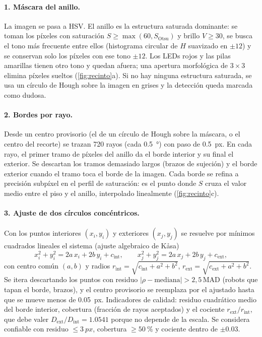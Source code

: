 \paragraph{1. Máscara del anillo.} La imagen se pasa a HSV. El anillo es la estructura saturada
dominante: se toman los píxeles con saturación $S \geq \max(60, S_{\mathrm{Otsu}})$ y brillo
$V \geq 30$, se busca el tono más frecuente entre ellos (histograma circular de $H$ suavizado en
$\pm 12$) y se conservan solo los píxeles con ese tono $\pm 12$. Los LEDs rojos y las pilas amarillas
tienen otro tono y quedan afuera; una apertura morfológica de $3\times3$ elimina píxeles sueltos
(\cref{fig:recinto}a). Si no hay ninguna estructura saturada, se usa un círculo de Hough sobre la
imagen en grises y la detección queda marcada como dudosa.

\paragraph{2. Bordes por rayo.} Desde un centro provisorio (el de un círculo de Hough sobre la máscara,
o el centro del recorte) se trazan 720 rayos (cada \SI{0.5}{\degree}) con paso de \SI{0.5}{px}. En cada
rayo, el primer tramo de píxeles del anillo da el borde interior y su final el exterior. Se descartan
los tramos demasiado largos (brazos de sujeción) y el borde exterior cuando el tramo toca el borde de
la imagen. Cada borde se refina a precisión subpíxel en el perfil de saturación: es el punto donde
$S$ cruza el valor medio entre el piso y el anillo, interpolado linealmente
(\cref{fig:recinto}c).

\paragraph{3. Ajuste de dos círculos concéntricos.} Con los puntos interiores $(x_i, y_i)$ y exteriores
$(x_j, y_j)$ se resuelve por mínimos cuadrados lineales el sistema (ajuste algebraico de Kåsa)
\begin{equation}
  x_i^2 + y_i^2 = 2a\,x_i + 2b\,y_i + c_{\mathrm{int}},\qquad
  x_j^2 + y_j^2 = 2a\,x_j + 2b\,y_j + c_{\mathrm{ext}},
\end{equation}
con centro común $(a,b)$ y radios $r_{\mathrm{int}} = \sqrt{c_{\mathrm{int}} + a^2 + b^2}$,
$r_{\mathrm{ext}} = \sqrt{c_{\mathrm{ext}} + a^2 + b^2}$. Se itera descartando los puntos con residuo
$|\rho - \mathrm{mediana}| > 2{,}5\,\mathrm{MAD}$ (robots que tapan el borde, brazos), y el centro
provisorio se reemplaza por el ajustado hasta que se mueve menos de \SI{0.05}{px}. Indicadores de
calidad: residuo cuadrático medio del borde interior, cobertura (fracción de rayos aceptados) y el
cociente $r_{\mathrm{ext}}/r_{\mathrm{int}}$, que debe valer $D_{\mathrm{ext}}/D_{\mathrm{int}} =
\num{1.0541}$ porque no depende de la escala. Se considera confiable con residuo $\leq\SI{3}{px}$,
cobertura $\geq\SI{50}{\percent}$ y cociente dentro de $\pm\num{0.03}$.

